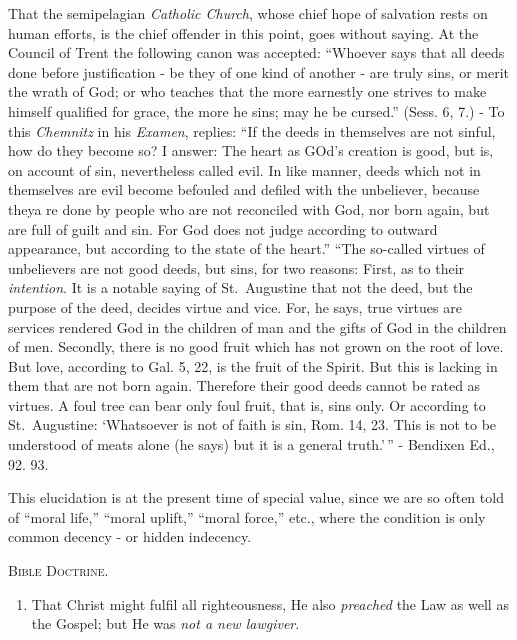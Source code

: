 \documentclass[
]{book}
\providecommand{\tightlist}{%
  \setlength{\itemsep}{0pt}\setlength{\parskip}{0pt}}
\begin{document}
That the semipelagian \emph{Catholic Church}, whose chief hope of salvation rests on human efforts, is the chief offender in this point, goes without saying. At the Council of Trent the following canon was accepted: ``Whoever says that all deeds done before justification - be they of one kind of another - are truly sins, or merit the wrath of God; or who teaches that the more earnestly one strives to make himself qualified for grace, the more he sins; may he be cursed.'' (Sess. 6, 7.) - To this \emph{Chemnitz} in his \emph{Examen}, replies: ``If the deeds in themselves are not sinful, how do they become so? I answer: The heart as GOd's creation is good, but is, on account of sin, nevertheless called evil. In like manner, deeds which not in themselves are evil become befouled and defiled with the unbeliever, because theya re done by people who are not reconciled with God, nor born again, but are full of guilt and sin. For God does not judge according to outward appearance, but according to the state of the heart.'' ``The so-called virtues of unbelievers are not good deeds, but sins, for two reasons: First, as to their \emph{intention}. It is a notable saying of St.~Augustine that not the deed, but the purpose of the deed, decides virtue and vice. For, he says, true virtues are services rendered God in the children of man and the gifts of God in the children of men. Secondly, there is no good fruit which has not grown on the root of love. But love, according to Gal. 5, 22, is the fruit of the Spirit. But this is lacking in them that are not born again. Therefore their good deeds cannot be rated as virtues. A foul tree can bear only foul fruit, that is, sins only. Or according to St.~Augustine: `Whatsoever is not of faith is sin, Rom. 14, 23. This is not to be understood of meats alone (he says) but it is a general truth.'\,'' - Bendixen Ed., 92. 93.

This elucidation is at the present time of special value, since we are so often told of ``moral life,'' ``moral uplift,'' ``moral force,'' etc., where the condition is only common decency - or hidden indecency.

\begin{center}
\textsc{Bible Doctrine.}
\end{center}

\begin{enumerate}
\def\labelenumi{\alph{enumi}.}
\setcounter{enumi}{2}
\tightlist
\item
  That Christ might fulfil all righteousness, He also \emph{preached} the Law as well as the Gospel; but He was \emph{not a new lawgiver}.
\end{enumerate}
\end{document}
